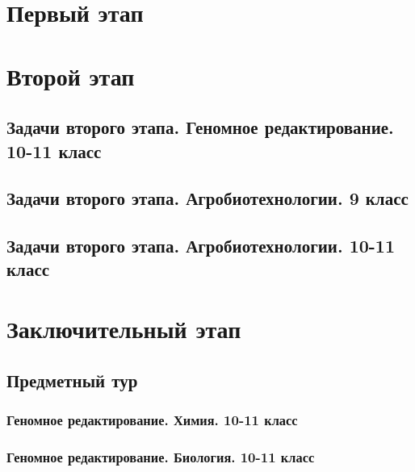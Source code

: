 \documentclass[a4paper,12pt,oneside]{book}
\begin{document}

\setcounter{tocdepth}{1}

\tableofcontents

\part{Первый этап}
\clearpage




\part{Второй этап}
\clearpage
\chapter{Задачи второго этапа. Геномное редактирование. 10-11 класс}


 
\chapter{Задачи второго этапа. Агробиотехнологии. 9 класс}


\chapter{Задачи второго этапа. Агробиотехнологии. 10-11 класс}


\part{Заключительный этап}

\clearpage
\chapter{Предметный тур}

\section{Геномное редактирование. Химия. 10-11 класс}


\section{Геномное редактирование. Биология. 10-11 класс}

\end{document}
